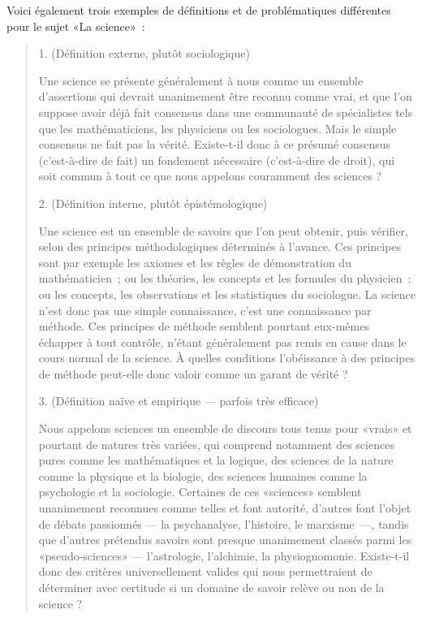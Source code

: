 \documentclass[a4paper,11pt]{article}
\begin{document}
\par

Voici également trois exemples de définitions et de problématiques
différentes pour le sujet «La science»~:

\begin{quote}
  1. (Définition externe, plutôt sociologique)

Une science se présente généralement à nous comme un ensemble
d'assertions qui devrait unanimement être reconnu comme vrai, et que
l'on suppose avoir déjà fait consensus dans une communauté de
spécialistes tels que les mathématiciens, les physiciens ou les
sociologues. Mais le simple consensus ne fait pas la vérité. Existe-t-il
donc à ce présumé consensus (c'est-à-dire de fait) un fondement
nécessaire (c'est-à-dire de droit), qui soit commun à tout ce que nous
appelons couramment des sciences ?


2. (Définition interne, plutôt épistémologique)

Une science est un ensemble de savoirs que l'on peut obtenir, puis
vérifier, selon des principes méthodologiques déterminés à l'avance. Ces
principes sont par exemple les axiomes et les règles de démonstration du
mathématicien~; ou les théories, les concepts et les formules du
physicien~; ou les concepts, les observations et les statistiques du
sociologue. La science n'est donc pas une simple connaissance, c'est une
connaissance par méthode. Ces principes de méthode semblent pourtant
eux-mêmes échapper à tout contrôle, n'étant généralement pas remis en
cause dans le cours normal de la science. À quelles conditions
l'obéissance à des principes de méthode peut-elle donc valoir comme un
garant de vérité ?


3. (Définition naïve et empirique — parfois très efficace)

Nous appelons sciences un ensemble de discours tous tenus pour «vrais»
et pourtant de natures très variées, qui comprend notamment des sciences
pures comme les mathématiques et la logique, des sciences de la nature
comme la physique et la biologie, des sciences humaines comme la
psychologie et la sociologie. Certaines de ces «sciences» semblent
unanimement reconnues comme telles et font autorité, d'autres font
l'objet de débats passionnés — la psychanalyse, l'histoire, le
marxisme~—, tandis que d'autres prétendus savoirs sont presque
unanimement classés parmi les «pseudo-sciences» — l'astrologie,
l'alchimie, la physiognomonie. Existe-t-il donc des critères
universellement valides qui nous permettraient de déterminer avec
certitude si un domaine de savoir relève ou non de la science ?
\end{quote}
\end{document}
